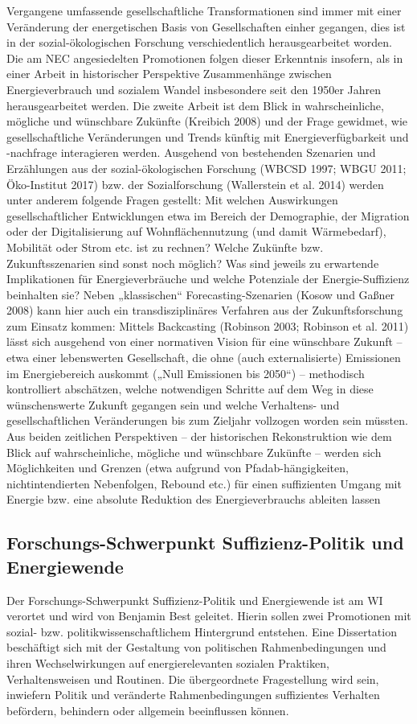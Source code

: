 \documentclass[a4paper,11pt,twoside]{scrartcl}
\begin{document}
Vergangene umfassende gesellschaftliche Transformationen sind immer mit einer Veränderung der energetischen Basis von Gesellschaften einher gegangen, dies ist in der sozial-ökologischen Forschung verschiedentlich herausgearbeitet worden. Die am NEC angesiedelten Promotionen folgen dieser Erkenntnis insofern, als in einer Arbeit in historischer Perspektive Zusammenhänge zwischen Energieverbrauch und sozialem Wandel insbesondere seit den 1950er Jahren herausgearbeitet werden. Die zweite Arbeit ist dem Blick in wahrscheinliche, mögliche und wünschbare Zukünfte (Kreibich 2008) und der Frage gewidmet, wie gesellschaftliche Veränderungen und Trends künftig mit Energieverfügbarkeit und -nachfrage interagieren werden. Ausgehend von bestehenden Szenarien und Erzählungen aus der sozial-ökologischen Forschung (WBCSD 1997; WBGU 2011; Öko-Institut 2017) bzw. der Sozialforschung (Wallerstein et al. 2014) werden unter anderem folgende Fragen gestellt: Mit welchen Auswirkungen gesellschaftlicher Entwicklungen etwa im Bereich der Demographie, der Migration oder der Digitalisierung auf Wohnflächennutzung (und damit Wärmebedarf), Mobilität oder Strom etc. ist zu rechnen? Welche Zukünfte bzw. Zukunftsszenarien sind sonst noch möglich? Was sind jeweils zu erwartende Implikationen für Energieverbräuche und welche Potenziale der Energie-Suffizienz beinhalten sie? Neben „klassischen“ Forecasting-Szenarien (Kosow und Gaßner 2008) kann hier auch ein transdisziplinäres Verfahren aus der Zukunftsforschung zum Einsatz kommen: Mittels Backcasting (Robinson 2003; Robinson et al. 2011) lässt sich ausgehend von einer normativen Vision für eine wünschbare Zukunft – etwa einer lebenswerten Gesellschaft, die ohne (auch externalisierte) Emissionen im Energiebereich auskommt („Null Emissionen bis 2050“) – methodisch kontrolliert abschätzen, welche notwendigen Schritte auf dem Weg in diese wünschenswerte Zukunft gegangen sein und welche Verhaltens- und gesellschaftlichen Veränderungen bis zum Zieljahr vollzogen worden sein müssten. 
Aus beiden zeitlichen Perspektiven – der historischen Rekonstruktion wie dem Blick auf wahrscheinliche, mögliche und wünschbare Zukünfte – werden sich Möglichkeiten und Grenzen (etwa aufgrund von Pfadab-hängigkeiten, nichtintendierten Nebenfolgen, Rebound etc.) für einen suffizienten Umgang mit Energie bzw. eine absolute Reduktion des Energieverbrauchs ableiten lassen  

\subsection*{Forschungs-Schwerpunkt Suffizienz-Politik und Energiewende}
Der Forschungs-Schwerpunkt Suffizienz-Politik und Energiewende ist am WI verortet und wird von Benjamin Best geleitet. Hierin sollen zwei Promotionen mit sozial- bzw. politikwissenschaftlichem Hintergrund entstehen. 
Eine Dissertation beschäftigt sich mit der Gestaltung von politischen Rahmenbedingungen und ihren Wechselwirkungen auf energierelevanten sozialen Praktiken, Verhaltensweisen und Routinen. Die übergeordnete Fragestellung wird sein, inwiefern Politik und veränderte Rahmenbedingungen suffizientes Verhalten befördern, behindern oder allgemein beeinflussen können.
\end{document}
